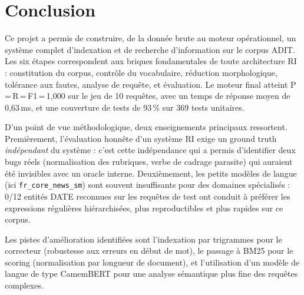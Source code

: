\chapter*{Conclusion}

Ce projet a permis de construire, de la donnée brute au moteur opérationnel, un système
complet d'indexation et de recherche d'information sur le corpus ADIT. Les six étapes
correspondent aux briques fondamentales de toute architecture RI : constitution du
corpus, contrôle du vocabulaire, réduction morphologique, tolérance aux fautes, analyse
de requête, et évaluation. Le moteur final atteint P\,=\,R\,=\,F1\,=\,1,000 sur le jeu
de 10 requêtes, avec un temps de réponse moyen de 0,63\,ms, et une couverture de tests
de 93\,\% sur 369 tests unitaires.

D'un point de vue méthodologique, deux enseignements principaux ressortent. Premièrement,
l'évaluation honnête d'un système RI exige un ground truth \emph{indépendant} du système :
c'est cette indépendance qui a permis d'identifier deux bugs réels (normalisation des
rubriques, verbe de cadrage parasite) qui auraient été invisibles avec un oracle interne.
Deuxièmement, les petits modèles de langue (ici \texttt{fr\_core\_news\_sm}) sont
souvent insuffisants pour des domaines spécialisés : 0/12 entités DATE reconnues sur
les requêtes de test ont conduit à préférer les expressions régulières hiérarchisées,
plus reproductibles et plus rapides sur ce corpus.

Les pistes d'amélioration identifiées sont l'indexation par trigrammes pour le correcteur
(robustesse aux erreurs en début de mot), le passage à BM25 pour le scoring (normalisation
par longueur de document), et l'utilisation d'un modèle de langue de type CamemBERT pour
une analyse sémantique plus fine des requêtes complexes.
